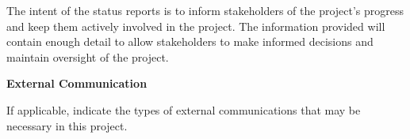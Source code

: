The intent of the status reports is to inform stakeholders of the project’s progress and keep them actively involved in the project. The information provided will contain enough detail to allow stakeholders to make informed decisions and maintain oversight of the project.

\textbf{External Communication}

If applicable, indicate the types of external communications that may be necessary in this project.

